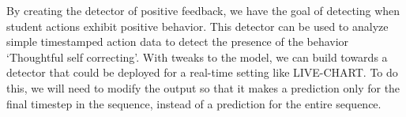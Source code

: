 \documentclass[12pt]{report}
\begin{document}
By creating the detector of positive feedback, we have the goal of detecting when student actions exhibit positive behavior. This detector can be used to analyze simple timestamped action data to detect the presence of the behavior `Thoughtful self correcting'. With tweaks to the model, we can build towards a detector that could be deployed for a real-time setting like LIVE-CHART. To do this, we will need to modify the output so that it makes a prediction only for the final timestep in the sequence, instead of a prediction for the entire sequence.

\clearpage



\end{document}

